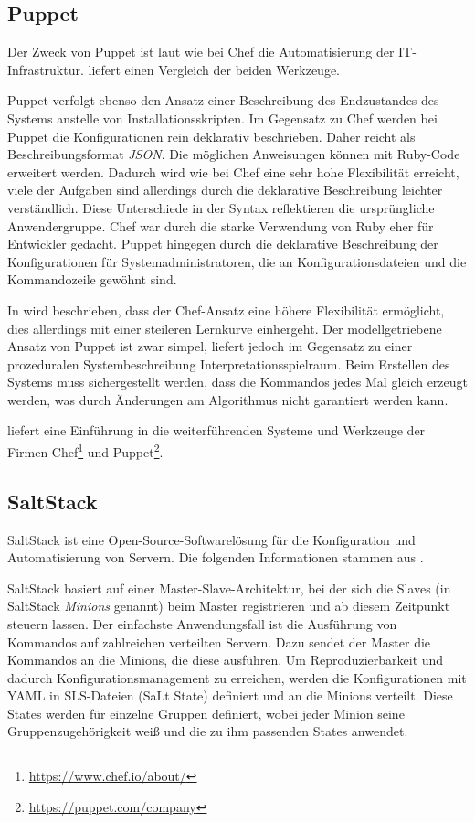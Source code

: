 \subsection{Puppet}
\label{sub:puppet}
Der Zweck von Puppet ist laut \autocite{Puppet:online} wie bei Chef die Automatisierung der IT-Infrastruktur. \autocite{Wolff201604} liefert einen Vergleich der beiden Werkzeuge.

Puppet verfolgt ebenso den Ansatz einer Beschreibung des Endzustandes des Systems anstelle von Installationsskripten.
Im Gegensatz zu Chef werden bei Puppet die Konfigurationen rein deklarativ beschrieben.
Daher reicht als Beschreibungsformat \emph{JSON}.
Die möglichen Anweisungen können mit Ruby-Code erweitert werden.
Dadurch wird wie bei Chef eine sehr hohe Flexibilität erreicht, viele der Aufgaben sind allerdings durch die deklarative Beschreibung leichter verständlich.
Diese Unterschiede in der Syntax reflektieren die ursprüngliche Anwendergruppe.
Chef war durch die starke Verwendung von Ruby eher für Entwickler gedacht.
Puppet hingegen durch die deklarative Beschreibung der Konfigurationen für Systemadministratoren, die an Konfigurationsdateien und die Kommandozeile gewöhnt sind.

In \autocite{chef-vs-puppet:online} wird beschrieben, dass der Chef-Ansatz eine höhere Flexibilität ermöglicht, dies allerdings mit einer steileren Lernkurve einhergeht.
Der modellgetriebene Ansatz von Puppet ist zwar simpel, liefert jedoch im Gegensatz zu einer prozeduralen Systembeschreibung Interpretationsspielraum.
Beim Erstellen des Systems muss sichergestellt werden, dass die Kommandos jedes Mal gleich erzeugt werden, was durch Änderungen am Algorithmus nicht garantiert werden kann.

\autocite{chef-vs-puppet-revisited:online} liefert eine Einführung in die weiterführenden Systeme und Werkzeuge der Firmen Chef\footnote{\url{https://www.chef.io/about/}} und Puppet\footnote{\url{https://puppet.com/company}}.

\subsection{SaltStack}
\label{sub:saltstack}
SaltStack ist eine Open-Source-Softwarelösung für die Konfiguration und Automatisierung von Servern.
Die folgenden Informationen stammen aus \autocite{SaltStack:online}.

SaltStack basiert auf einer Master-Slave-Architektur, bei der sich die Slaves (in SaltStack \emph{Minions} genannt) beim Master registrieren und ab diesem Zeitpunkt steuern lassen.
Der einfachste Anwendungsfall ist die Ausführung von Kommandos auf zahlreichen verteilten Servern.
Dazu sendet der Master die Kommandos an die Minions, die diese ausführen.
Um Reproduzierbarkeit und dadurch Konfigurationsmanagement zu erreichen, werden die Konfigurationen mit YAML in SLS-Dateien (SaLt State) definiert und an die Minions verteilt.
Diese States werden für einzelne Gruppen definiert, wobei jeder Minion seine Gruppenzugehörigkeit weiß und die zu ihm passenden States anwendet.

